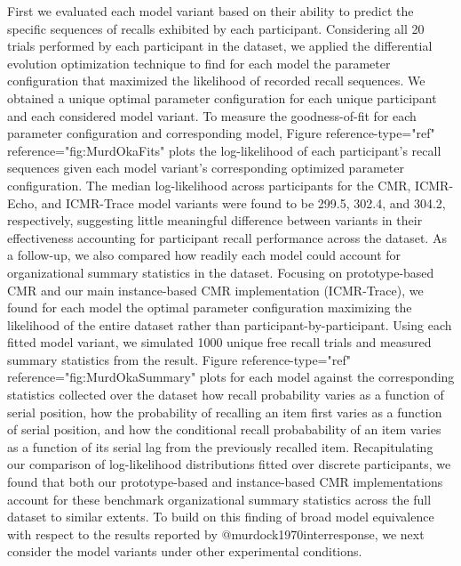 {}First we evaluated each model variant based on their ability to predict the specific sequences of recalls exhibited by each participant. Considering all 20 trials performed by each participant in the dataset, we applied the differential evolution optimization technique to find for each model the parameter configuration that maximized the likelihood of recorded recall sequences. We obtained a unique optimal parameter configuration for each unique participant and each considered model variant. To measure the goodness-of-fit for each parameter configuration and corresponding model, Figure \markdownRendererLeftBrace{}reference-type="ref" reference="fig:MurdOkaFits"\markdownRendererRightBrace{} plots the log-likelihood of each participant's recall sequences given each model variant's corresponding optimized parameter configuration. The median log-likelihood across participants for the CMR, ICMR-Echo, and ICMR-Trace model variants were found to be 299.5, 302.4, and 304.2, respectively, suggesting little meaningful difference between variants in their effectiveness accounting for participant recall performance across the dataset.\markdownRendererInterblockSeparator
{}As a follow-up, we also compared how readily each model could account for organizational summary statistics in the dataset. Focusing on prototype-based CMR and our main instance-based CMR implementation (ICMR-Trace), we found for each model the optimal parameter configuration maximizing the likelihood of the entire dataset rather than participant-by-participant. Using each fitted model variant, we simulated 1000 unique free recall trials and measured summary statistics from the result. Figure \markdownRendererLeftBrace{}reference-type="ref" reference="fig:MurdOkaSummary"\markdownRendererRightBrace{} plots for each model against the corresponding statistics collected over the dataset how recall probability varies as a function of serial position, how the probability of recalling an item first varies as a function of serial position, and how the conditional recall probabability of an item varies as a function of its serial lag from the previously recalled item. Recapitulating our comparison of log-likelihood distributions fitted over discrete participants, we found that both our prototype-based and instance-based CMR implementations account for these benchmark organizational summary statistics across the full dataset to similar extents. To build on this finding of broad model equivalence with respect to the results reported by @murdock1970interresponse, we next consider the model variants under other experimental conditions.\markdownRendererInterblockSeparator
